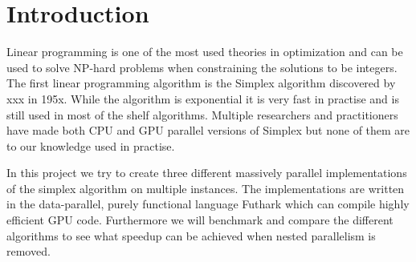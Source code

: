 \section{Introduction}
Linear programming is one of the most used theories in optimization and can be used to solve NP-hard problems when constraining the solutions to be integers. The first linear programming algorithm is the Simplex algorithm discovered by xxx in 195x. While the algorithm is exponential it is very fast in practise and is still used in most of the shelf algorithms. Multiple researchers and practitioners have made both CPU and GPU parallel versions of Simplex but none of them are to our knowledge  used in practise.

In this project we try to create three different massively parallel implementations of the simplex algorithm on multiple instances. The implementations are written in the data-parallel, purely functional language Futhark which can compile highly efficient GPU code. Furthermore we will benchmark and compare the different algorithms to see what speedup can be achieved when nested parallelism is removed.